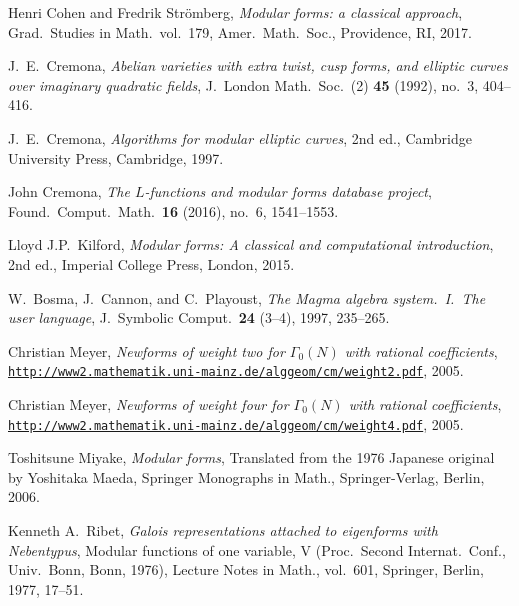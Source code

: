 \documentclass[11pt]{amsart}
\numberwithin{equation}{subsection}
\theoremstyle{plain}
\theoremstyle{definition}
\begin{document}
\begin{thebibliography}{999}

Henri Cohen and Fredrik Str\"omberg, \emph{Modular forms: a classical approach}, Grad.\ Studies in Math.\, vol.\ 179, Amer.\ Math.\ Soc., Providence, RI, 2017.

J.\ E.\ Cremona, \emph{Abelian varieties with extra twist, cusp forms, and elliptic curves over imaginary quadratic fields}, J.\ London Math.\ Soc.\ (2) \textbf{45} (1992), no.\ 3, 404--416.

J.\ E.\ Cremona, \emph{Algorithms for modular elliptic curves}, 2nd ed., Cambridge University Press, Cambridge, 1997.

John Cremona, \emph{The $L$-functions and modular forms database project}, Found.\ Comput.\ Math.\ \textbf{16} (2016), no.\ 6, 1541--1553.

Lloyd J.P.\ Kilford, \emph{Modular forms: A classical and computational introduction}, 2nd ed., Imperial College Press, London, 2015.

W.~Bosma, J.~Cannon, and C.~Playoust, \emph{The Magma algebra system.\ I.\ The user language}, J.\ Symbolic Comput.\ \textbf{24} (3--4), 1997, 235--265.

Christian Meyer, \emph{Newforms of weight two for $\Gamma_0(N)$ with rational coefficients}, \\ \href{http://www2.mathematik.uni-mainz.de/alggeom/cm/weight2.pdf}{\texttt{http://www2.mathematik.uni-mainz.de/alggeom/cm/weight2.pdf}}, 2005.

Christian Meyer, \emph{Newforms of weight four for $\Gamma_0(N)$ with rational coefficients}, \\ \href{http://www2.mathematik.uni-mainz.de/alggeom/cm/weight4.pdf}{\texttt{http://www2.mathematik.uni-mainz.de/alggeom/cm/weight4.pdf}}, 2005.

Toshitsune Miyake, \emph{Modular forms}, Translated from the 1976 Japanese original by Yoshitaka Maeda, Springer Monographs in Math., Springer-Verlag, Berlin, 2006.

Kenneth A.\ Ribet, \emph{Galois representations attached to eigenforms with Nebentypus}, Modular functions of one variable, V (Proc.\ Second Internat.\ Conf., Univ.\ Bonn, Bonn, 1976), Lecture Notes in Math., vol.\ 601, Springer, Berlin, 1977, 17--51.


\end{thebibliography}
\end{document}
